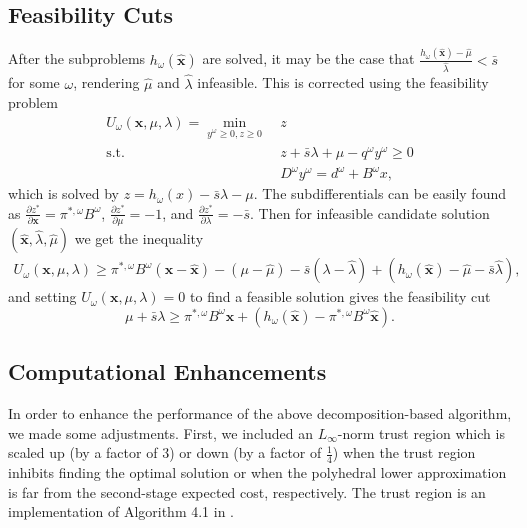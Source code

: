\documentclass[ijoc,nonblindrev]{informs3} %
\newcommand{\x}{\mathbf{x}}
\newcommand{\xh}{\hat{\x}}
\newcommand{\lh}{\hat{\lambda}}
\newcommand{\mh}{\hat{\mu}}
\newcommand{\st}{\mbox{s.t.}}
\begin{document}
\subsection{Feasibility Cuts}
After the subproblems $h_\omega(\xh)$ are solved, it may be the case that $\frac{h_\omega(\xh)-\mh}{\lh} < \bar{s}$ for some $\omega$, rendering $\mh$ and $\lh$ infeasible.
This is corrected using the feasibility problem
\begin{align*}
	U_\omega(\x,\mu,\lambda) = \min_{y^\omega \geq 0, z \geq 0} \ & z \\
	\st \ & z + \bar{s}\lambda + \mu - q^\omega y^\omega \geq 0 \\
	& D^\omega y^\omega = d^\omega + B^\omega x,
\end{align*}
which is solved by $z = h_\omega(x) - \bar{s}\lambda - \mu$.
The subdifferentials can be easily found as $\frac{\partial z^*}{\partial \x} = \pi^{*,\omega} B^\omega$, $\frac{\partial z^*}{\partial \mu} = -1$, and $\frac{\partial z^*}{\partial \lambda} = -\bar{s}$.
Then for infeasible candidate solution $(\xh,\lh,\mh)$ we get the inequality
\begin{align*}
	U_\omega(\x,\mu,\lambda) \geq \pi^{*,\omega}B^\omega(\x-\xh) - (\mu -\mh) - \bar{s}(\lambda - \lh) + (h_\omega(\xh) - \mh - \bar{s}\lh),
\end{align*}
and setting $U_\omega(\x,\mu,\lambda) = 0$ to find a feasible solution gives the feasibility cut
\[
	\mu + \bar{s} \lambda \geq \pi^{*,\omega}B^\omega \x + (h_\omega(\xh) - \pi^{*,\omega}B^\omega\xh).
\]


\subsection{Computational Enhancements}

In order to enhance the performance of the above decomposition-based algorithm, we made some adjustments.
First, we included an $L_\infty$-norm trust region which is scaled up (by a factor of $3$) or down (by a factor of $\tfrac{1}{4}$) when the trust region inhibits finding the optimal solution or when the polyhedral lower approximation is far from the second-stage expected cost, respectively.
The trust region is an implementation of Algorithm 4.1 in \cite{nocedal1999numerical}.
\end{document}
